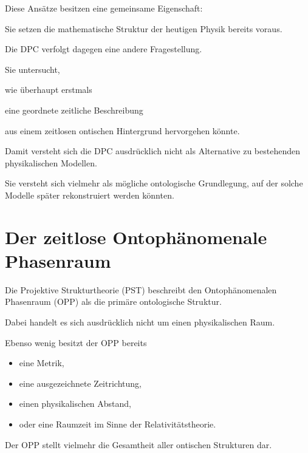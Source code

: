 \documentclass[11pt,a4paper]{article}
\begin{document}
Diese Ansätze besitzen eine gemeinsame Eigenschaft:

Sie setzen die mathematische Struktur der heutigen
Physik bereits voraus.

Die DPC verfolgt dagegen eine andere Fragestellung.

Sie untersucht,

wie überhaupt erstmals

eine geordnete zeitliche Beschreibung

aus einem zeitlosen ontischen Hintergrund
hervorgehen könnte.

Damit versteht sich die DPC ausdrücklich nicht als
Alternative zu bestehenden physikalischen Modellen.

Sie versteht sich vielmehr als mögliche ontologische
Grundlegung,
auf der solche Modelle später rekonstruiert werden
könnten.


\section{Der zeitlose Ontophänomenale Phasenraum}

Die Projektive Strukturtheorie (PST) beschreibt den
Ontophänomenalen Phasenraum (OPP) als die primäre
ontologische Struktur.

Dabei handelt es sich ausdrücklich nicht um einen
physikalischen Raum.

Ebenso wenig besitzt der OPP bereits

\begin{itemize}

\item eine Metrik,

\item eine ausgezeichnete Zeitrichtung,

\item einen physikalischen Abstand,

\item oder eine Raumzeit im Sinne der Relativitätstheorie.

\end{itemize}

Der OPP stellt vielmehr die Gesamtheit aller ontischen
Strukturen dar.
\end{document}
